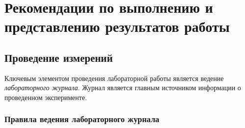 \chapter{Рекомендации по выполнению и представлению результатов работы}


\section{Проведение измерений}

Ключевым элементом проведения лабораторной работы является ведение \emph{лабораторного
журнала}. Журнал является главным источником информации о проведенном
эксперименте.

\subsection{Правила ведения лабораторного журнала}
\label{sec:journal}

\enlargethispage{1em}

